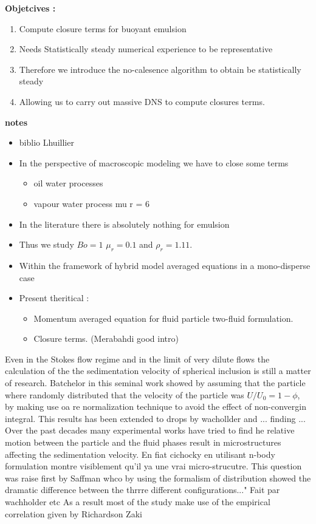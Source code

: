 \textbf{Objetcives : }

\begin{enumerate}
    \item Compute closure terms for buoyant emulsion
    \item Needs Statistically steady numerical experience to be representative 
    \item Therefore we introduce the no-calesence algorithm to obtain be statistically steady
    \item Allowing us to carry out massive DNS to compute closures terms. 
\end{enumerate}
\vspace*{1cm}
\textbf{notes}
\begin{itemize}
    \item biblio Lhuillier
    \item In the perspective of macroscopic modeling we have to close some terms 
    \begin{itemize}
        \item oil water processes
        \item vapour water process mu r = 6 
    \end{itemize}
    \item In the literature there is absolutely nothing for emulsion 
    \item Thus we study $Bo = 1$ $\mu_r = 0.1$ and $\rho_r = 1.11$. 
    \item Within the framework of hybrid model averaged equations in a mono-disperse case 
    \item Present theritical : 
     \begin{itemize}
        \item Momentum averaged equation for fluid particle two-fluid formulation. 
        \item Closure terms. (Merabahdi good intro)
    \end{itemize}
\end{itemize}

Even in the Stokes flow regime and in the limit of very dilute flows the calculation of the the sedimentation velocity of spherical inclusion is still a matter of research.  Batchelor in this seminal work showed by assuming that the particle where randomly distributed that the velocity of the particle was $U/U_0=1-\phi$, by making use oa re normalization technique to avoid the effect of non-convergin integral. This results has been extended to drops by wachollder and ... finding ... Over the past decades many experimental works have tried to find he relative motion between the particle and
the fluid phases result in microstructures affecting the sedimentation
velocity. En fiat cichocky en utilisant n-body formulation montre visiblement qu'il ya une vrai micro-strucutre. This question was raise first by Saffman whco by using the formalism of distribution showed the dramatic difference between the thrrre different configurations..."
Fait par wachholder etc As a result most of the study make use of the empirical correlation given by Richardson Zaki

